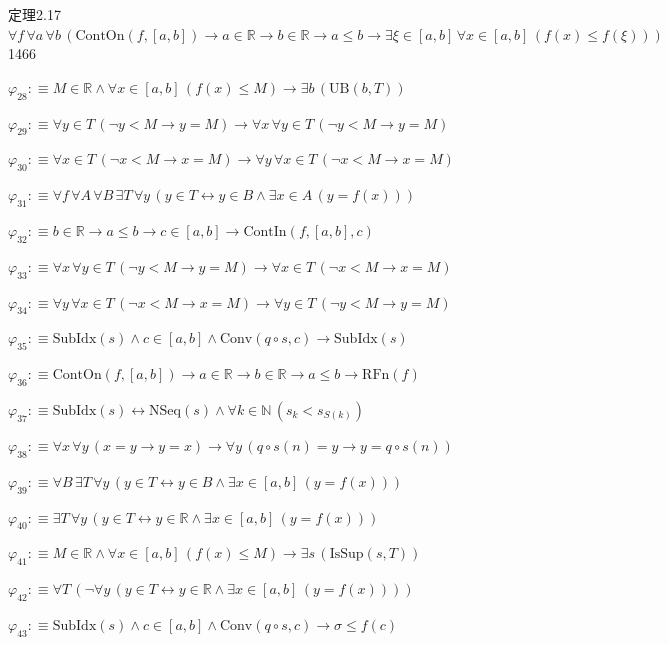 \begin{fullproof}{定理2.17}{$\forall f\,\forall a\,\forall b\,(\mathrm{ContOn}(f,[a,b]) \to a \in \mathbb{R} \to b \in \mathbb{R} \to a \leq b \to \exists \xi \in [a,b]\,\forall x \in [a,b]\,(f(x) \leq f(\xi)))$}{1466}
\begin{abbrevlist}
\item $\varphi_{28} :\equiv M \in \mathbb{R} \land \forall x \in [a,b]\,(f(x) \leq M) \to \exists b\,(\mathrm{UB}(b,T))$
\item $\varphi_{29} :\equiv \forall y \in T\,(\neg y < M \to y = M) \to \forall x\,\forall y \in T\,(\neg y < M \to y = M)$
\item $\varphi_{30} :\equiv \forall x \in T\,(\neg x < M \to x = M) \to \forall y\,\forall x \in T\,(\neg x < M \to x = M)$
\item $\varphi_{31} :\equiv \forall f\,\forall A\,\forall B\,\exists T\,\forall y\,(y \in T \leftrightarrow y \in B \land \exists x \in A\,(y = f(x)))$
\item $\varphi_{32} :\equiv b \in \mathbb{R} \to a \leq b \to c \in [a,b] \to \mathrm{ContIn}(f,[a,b],c)$
\item $\varphi_{33} :\equiv \forall x\,\forall y \in T\,(\neg y < M \to y = M) \to \forall x \in T\,(\neg x < M \to x = M)$
\item $\varphi_{34} :\equiv \forall y\,\forall x \in T\,(\neg x < M \to x = M) \to \forall y \in T\,(\neg y < M \to y = M)$
\item $\varphi_{35} :\equiv \mathrm{SubIdx}(s) \land c \in [a,b] \land \mathrm{Conv}(q \circ s,c) \to \mathrm{SubIdx}(s)$
\item $\varphi_{36} :\equiv \mathrm{ContOn}(f,[a,b]) \to a \in \mathbb{R} \to b \in \mathbb{R} \to a \leq b \to \mathrm{RFn}(f)$
\item $\varphi_{37} :\equiv \mathrm{SubIdx}(s) \leftrightarrow \mathrm{NSeq}(s) \land \forall k \in \mathbb{N}\,(s_{k} < s_{S(k)})$
\item $\varphi_{38} :\equiv \forall x\,\forall y\,(x = y \to y = x) \to \forall y\,(q \circ s(n) = y \to y = q \circ s(n))$
\item $\varphi_{39} :\equiv \forall B\,\exists T\,\forall y\,(y \in T \leftrightarrow y \in B \land \exists x \in [a,b]\,(y = f(x)))$
\item $\varphi_{40} :\equiv \exists T\,\forall y\,(y \in T \leftrightarrow y \in \mathbb{R} \land \exists x \in [a,b]\,(y = f(x)))$
\item $\varphi_{41} :\equiv M \in \mathbb{R} \land \forall x \in [a,b]\,(f(x) \leq M) \to \exists s\,(\mathrm{IsSup}(s,T))$
\item $\varphi_{42} :\equiv \forall T\,(\neg \forall y\,(y \in T \leftrightarrow y \in \mathbb{R} \land \exists x \in [a,b]\,(y = f(x))))$
\item $\varphi_{43} :\equiv \mathrm{SubIdx}(s) \land c \in [a,b] \land \mathrm{Conv}(q \circ s,c) \to \sigma \leq f(c)$

\end{abbrevlist}
\end{fullproof}
